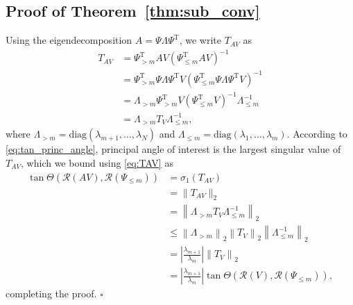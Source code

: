 \documentclass[10pt,preprint]{elsarticle}
\newenvironment{proof}{{\noindent \bf \em Proof:}}{\hfill$\square$}
\renewcommand{\top}{\text{T}}
\def\R{\mathcal{R}}
\begin{document}
\begin{appendices}
\section{Proof of Theorem~\ref{thm:sub_conv}}
\label{sec:proofsub}
\begin{proof}
Using the eigendecomposition $A = \Psi \Lambda \Psi^{\top}$, we write $T_{AV}$ as  
\begin{equation} \label{eq:TAV}
\begin{aligned}
T_{AV} &= \Psi_{>m}^{\top} AV \left(\Psi_{\leq m}^{\top} AV\right)^{-1} \\
&= \Psi_{>m}^{\top} \Psi \Lambda \Psi^{\top} V \left(\Psi_{\leq m}^{\top} \Psi \Lambda \Psi^{\top} V\right)^{-1} \\
&= \Lambda_{>m} \Psi_{>m}^{\top} V \left(\Psi_{\leq m}^{\top} V\right)^{-1} \Lambda_{\leq m}^{-1} \\
&= \Lambda_{>m} T_V \Lambda_{\leq m}^{-1}, 
\end{aligned}
\end{equation}
where $\Lambda_{>m} = \text{diag}(\lambda_{m+1},\ldots,\lambda_{N})$ and $\Lambda_{\leq m} = \text{diag}(\lambda_{1},\ldots,\lambda_{m})$. 
%
According to \eqref{eq:tan_princ_angle}, principal angle of interest is the largest singular value of $T_{AV}$, which we bound using \eqref{eq:TAV} as 
\begin{equation} \label{eq:p_angle_dec}
\begin{aligned}
\tan \Theta(\R(AV),\R(\Psi_{\leq m})) &= \sigma_1(T_{AV})\\ 
&= \|T_{AV}\|_2 \\
&= \left\| \Lambda_{>m} T_V \Lambda_{\leq m}^{-1} \right\|_2 \\
&\leq \left\| \Lambda_{>m} \right\|_2 \left\| T_V \right\|_2 \left\|\Lambda_{\leq m}^{-1} \right\|_2 \\
&= \left|\frac{\lambda_{m+1}}{\lambda_m}\right| \left\|T_V\right\|_2 \\
&= \left|\frac{\lambda_{m+1}}{\lambda_m}\right| \tan \Theta(\R(V),\R(\Psi_{\leq m})),
\end{aligned}
\end{equation}
completing the proof. 
\end{proof}

\end{appendices}
\end{document}
